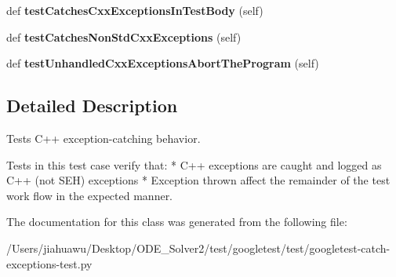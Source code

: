 \begin{DoxyCompactItemize}
def {\bfseries test\+Catches\+Cxx\+Exceptions\+In\+Test\+Body} (self)
\item 
\mbox{\label{classgoogletest-catch-exceptions-test_1_1_catch_cxx_exceptions_test_a01731aaf8269fc952559f5684b395119}} 
def {\bfseries test\+Catches\+Non\+Std\+Cxx\+Exceptions} (self)
\item 
\mbox{\label{classgoogletest-catch-exceptions-test_1_1_catch_cxx_exceptions_test_ab2304b62b833f0729e8909ad8615212c}} 
def {\bfseries test\+Unhandled\+Cxx\+Exceptions\+Abort\+The\+Program} (self)
\end{DoxyCompactItemize}


\subsection{Detailed Description}
\begin{DoxyVerb}Tests C++ exception-catching behavior.

   Tests in this test case verify that:
   * C++ exceptions are caught and logged as C++ (not SEH) exceptions
   * Exception thrown affect the remainder of the test work flow in the
     expected manner.
\end{DoxyVerb}
 

The documentation for this class was generated from the following file\+:\begin{DoxyCompactItemize}
\item 
/\+Users/jiahuawu/\+Desktop/\+O\+D\+E\+\_\+\+Solver2/test/googletest/test/googletest-\/catch-\/exceptions-\/test.\+py\end{DoxyCompactItemize}
